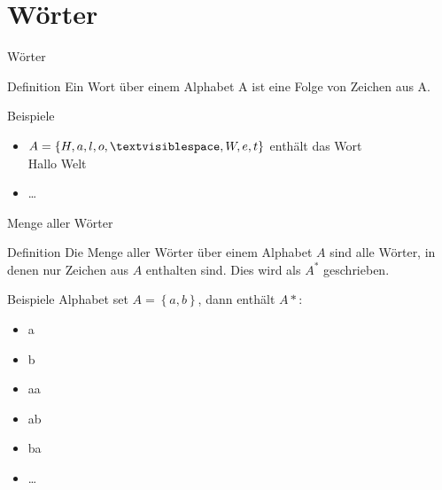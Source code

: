 \section{Wörter}
\begin{frame}{Wörter}
    \begin{block}{Definition}
        Ein Wort über einem Alphabet A ist eine Folge von Zeichen aus A.
    \end{block}
    \begin{exampleblock}{Beispiele}
        \begin{itemize}
            \item $A = \left\{H, a, l, o, \textvisiblespace, W, e, t\right\}$  enthält das Wort\\
            Hallo Welt
            \item \dots
        \end{itemize}
    \end{exampleblock}
\end{frame}

\begin{frame}{Menge aller Wörter}
    \begin{block}{Definition}
        Die Menge aller Wörter über einem Alphabet $A$ sind alle Wörter, in denen nur Zeichen aus $A$ enthalten sind. Dies wird als $A^*$ geschrieben.
        \end{block}
    \begin{exampleblock}{Beispiele}
        Alphabet set $A = \left\{a, b \right\}$, dann enthält $A*$:
        \begin{itemize}
            \item a
            \item b
            \item aa
            \item ab
            \item ba
            \item \dots
        \end{itemize}
    \end{exampleblock}
\end{frame}

